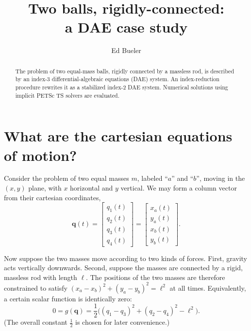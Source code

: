 \documentclass[letterpaper,final,12pt,reqno]{amsart}
\newcommand{\bq}{\mathbf{q}}
\begin{document}
\title[Two balls, rigidly-connected]{Two balls, rigidly-connected: \\ a DAE case study}

\author{Ed Bueler}

\begin{abstract}
The problem of two equal-mass balls, rigidly connected by a massless rod, is described by an index-3 differential-algebraic equations (DAE) system.  An index-reduction procedure rewrites it as a stabilized index-2 DAE system.  Numerical solutions using implicit PETSc TS solvers are evaluated.
\end{abstract}

\maketitle


\thispagestyle{empty}
\bigskip

\section{What are the cartesian equations of motion?}

Consider the problem of two equal masses $m$, labeled ``$a$'' and ``$b$'', moving in the $(x,y)$ plane, with $x$ horizontal and $y$ vertical.  We may form a column vector from their cartesian coordinates,
\begin{equation}
\bq(t) = \begin{bmatrix} q_1(t) \\ q_2(t) \\ q_3(t) \\ q_4(t) \end{bmatrix} = \begin{bmatrix} x_a(t) \\ y_a(t) \\ x_b(t) \\ y_b(t) \end{bmatrix}. \label{position}
\end{equation}

Now suppose the two masses move according to two kinds of forces.  First, gravity acts vertically downwards.  Second, suppose the masses are connected by a rigid, massless rod with length $\ell$.  The positions of the two masses are therefore constrained to satisfy $(x_a - x_b)^2 + (y_a - y_b)^2 = \ell^2$ at all times.  Equivalently, a certain scalar function is identically zero:
\begin{equation}
0 = g(\bq) = \frac{1}{2} \Big((q_1 - q_3)^2 + (q_2 - q_4)^2 - \ell^2\Big). \label{constraint}
\end{equation}
(The overall constant $\frac{1}{2}$ is chosen for later convenience.)
\end{document}
